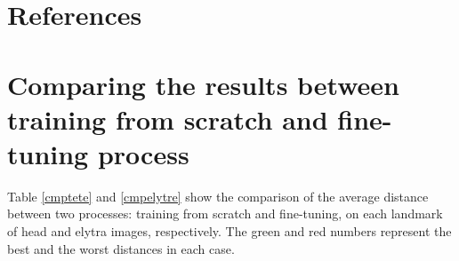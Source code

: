 \documentclass[review]{elsarticle}
\begin{document}
\section*{References}



\pagebreak
\appendix
\section{Comparing the results between training from scratch and fine-tuning process}
\label{appdixA1}
Table \ref{cmptete} and \ref{cmpelytre} show the comparison of the average distance between two processes: training from scratch and fine-tuning, on each landmark of head and elytra images, respectively. The green and red numbers represent the best and the worst distances in each case.
\end{document}
